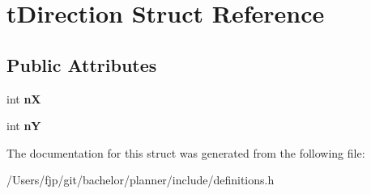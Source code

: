\hypertarget{structt_direction}{}\section{t\+Direction Struct Reference}
\label{structt_direction}
\subsection*{Public Attributes}
\begin{DoxyCompactItemize}
\item 
\mbox{\label{structt_direction_a13679c6cd0c99c180b99288bfef014ba}} 
int {\bfseries nX}
\item 
\mbox{\label{structt_direction_ae8b14a9d300a6f62e67e27da1cdf7ba7}} 
int {\bfseries nY}
\end{DoxyCompactItemize}


The documentation for this struct was generated from the following file\+:\begin{DoxyCompactItemize}
\item 
/\+Users/fjp/git/bachelor/planner/include/definitions.\+h\end{DoxyCompactItemize}
